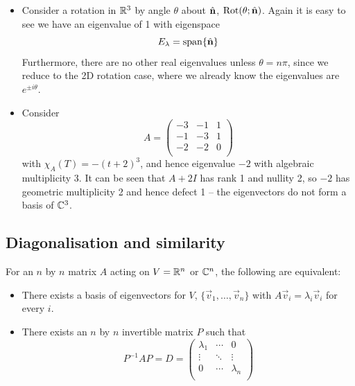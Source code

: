 \documentclass{../template/note}
\begin{document}
\begin{example}
\begin{itemize}
            \item Consider a rotation in \(\mathbb R^3\) by angle \(\theta\) about \(\hvec n\), \(\Rot(\theta; \hvec n)\). Again it is easy to see we have an eigenvalue of 1 with eigenspace
            \[
                E_\lambda = \Span \{\hvec n\}
            \]
            Furthermore, there are no other real eigenvalues unless \(\theta = n\pi\), since we reduce to the 2D rotation case, where we already know the eigenvalues are \(e^{\pm i \theta}\).
            \item Consider
            \[
                A = \begin{pmatrix}
                 -3 & -1 & 1 \\
                 -1 & -3 & 1 \\
                 -2 & -2 & 0 \\
                \end{pmatrix}
            \]
            with \(\chi_A(T) = -(t+2)^3\), and hence eigenvalue \(-2\) with algebraic multiplicity 3. It can be seen that \(A + 2I\) has rank 1 and nullity 2, so \(-2\) has geometric multiplicity 2 and hence defect 1 -- the eigenvectors do not form a basis of \(\mathbb C^3\).
        \end{itemize}
    \end{example}
    
    \subsection{Diagonalisation and similarity}

    \begin{proposition}
        For an \(n\) by \(n\) matrix \(A\) acting on \(V = \mathbb R^n\) or \(\mathbb C^n\), the following are equivalent:
        \begin{itemize}
            \item There exists a basis of eigenvectors for \(V\), \(\{\vec v_1, \dots, \vec v_n\}\) with \(A\vec v_i = \lambda_i \vec v_i\) for every \(i\).
            \item There exists an \(n\) by \(n\) invertible matrix \(P\) such that
            \[
                P^{-1}AP = D = \begin{pmatrix}
                 \lambda_1 & \cdots & 0 \\
                 \vdots & \ddots & \vdots \\
                 0 & \cdots & \lambda_n \\
                \end{pmatrix}
            \]
        \end{itemize}
        \label{diagonalisability-conditions}
    \end{proposition}
    
\end{document}
